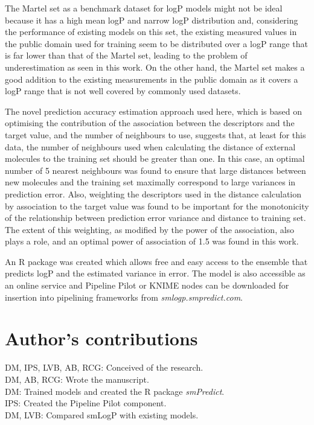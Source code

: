 \documentclass[10pt]{bmc_article}
\newenvironment{bmcformat}{\begin{raggedright}\baselineskip20pt\sloppy\setboolean{publ}{false}}{\end{raggedright}\baselineskip20pt\sloppy}
\begin{document}
\begin{bmcformat}
The Martel set as a benchmark dataset for logP models might not be ideal because it has a high mean logP and narrow logP distribution and, considering the performance of existing models on this set, the existing measured values in the public domain used for training seem to be distributed over a logP range that is far lower than that of the Martel set, leading to the problem of underestimation as seen in this work. On the other hand, the Martel set makes a good addition to the existing measurements in the public domain as it covers a logP range that is not well covered by commonly used datasets.

The novel prediction accuracy estimation approach used here, which is based on optimising the contribution of the association between the descriptors and the target value, and the number of neighbours to use, suggests that, at least for this data, the number of neighbours used when calculating the distance of external molecules to the training set should be greater than one. In this case, an optimal number of 5 nearest neighbours was found to ensure that large distances between new molecules and the training set maximally correspond to large variances in prediction error. Also, weighting the descriptors used in the distance calculation by association to the target value was found to be important for the monotonicity of the relationship between prediction error variance and distance to training set. The extent of this weighting, as modified by the power of the association, also plays a role, and an optimal power of association of 1.5 was found in this work.

An R package was created which allows free and easy access to the ensemble that predicts logP and the estimated variance in error. The model is also accessible as an online service and Pipeline Pilot or KNIME nodes can be downloaded for insertion into pipelining frameworks from \textit{smlogp.smpredict.com}. 

\section*{Author's contributions}
DM, IPS, LVB, AB, RCG: Conceived of the research.\\
DM, AB, RCG: Wrote the manuscript.\\
DM: Trained models and created the R package \textit{smPredict}.\\
IPS: Created the Pipeline Pilot component.\\
DM, LVB: Compared smLogP with existing models.\\ 
%

\end{bmcformat}
\end{document}
